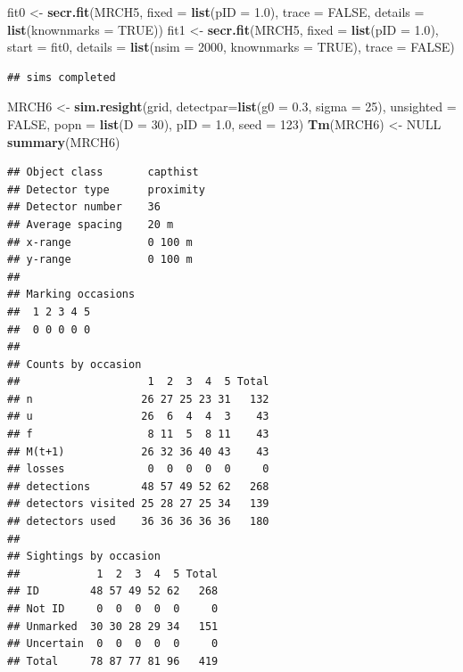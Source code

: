 \documentclass[
]{book}
\newenvironment{Shaded}{\begin{snugshade}}{\end{snugshade}}
\newcommand{\AttributeTok}[1]{\textcolor[rgb]{0.13,0.29,0.53}{#1}}
\newcommand{\ConstantTok}[1]{\textcolor[rgb]{0.56,0.35,0.01}{#1}}
\newcommand{\DecValTok}[1]{\textcolor[rgb]{0.00,0.00,0.81}{#1}}
\newcommand{\FloatTok}[1]{\textcolor[rgb]{0.00,0.00,0.81}{#1}}
\newcommand{\FunctionTok}[1]{\textcolor[rgb]{0.13,0.29,0.53}{\textbf{#1}}}
\newcommand{\NormalTok}[1]{#1}
\newcommand{\OtherTok}[1]{\textcolor[rgb]{0.56,0.35,0.01}{#1}}
\begin{document}
\begin{Shaded}
\begin{Highlighting}[]
\NormalTok{fit0 }\OtherTok{\textless{}{-}} \FunctionTok{secr.fit}\NormalTok{(MRCH5, }\AttributeTok{fixed =} \FunctionTok{list}\NormalTok{(}\AttributeTok{pID =} \FloatTok{1.0}\NormalTok{), }\AttributeTok{trace =} \ConstantTok{FALSE}\NormalTok{,}
                 \AttributeTok{details =} \FunctionTok{list}\NormalTok{(}\AttributeTok{knownmarks =} \ConstantTok{TRUE}\NormalTok{))}
\NormalTok{fit1 }\OtherTok{\textless{}{-}} \FunctionTok{secr.fit}\NormalTok{(MRCH5, }\AttributeTok{fixed =} \FunctionTok{list}\NormalTok{(}\AttributeTok{pID =} \FloatTok{1.0}\NormalTok{), }\AttributeTok{start =}\NormalTok{ fit0, }
                 \AttributeTok{details =} \FunctionTok{list}\NormalTok{(}\AttributeTok{nsim =} \DecValTok{2000}\NormalTok{, }\AttributeTok{knownmarks =} \ConstantTok{TRUE}\NormalTok{),}
                 \AttributeTok{trace =} \ConstantTok{FALSE}\NormalTok{)}
\end{Highlighting}
\end{Shaded}

\begin{verbatim}
## sims completed
\end{verbatim}

\begin{Shaded}
\begin{Highlighting}[]
\NormalTok{MRCH6 }\OtherTok{\textless{}{-}} \FunctionTok{sim.resight}\NormalTok{(grid, }\AttributeTok{detectpar=}\FunctionTok{list}\NormalTok{(}\AttributeTok{g0 =} \FloatTok{0.3}\NormalTok{, }\AttributeTok{sigma =} \DecValTok{25}\NormalTok{), }
           \AttributeTok{unsighted =} \ConstantTok{FALSE}\NormalTok{, }\AttributeTok{popn =} \FunctionTok{list}\NormalTok{(}\AttributeTok{D =} \DecValTok{30}\NormalTok{), }\AttributeTok{pID =} \FloatTok{1.0}\NormalTok{, }\AttributeTok{seed =} \DecValTok{123}\NormalTok{)}
\FunctionTok{Tm}\NormalTok{(MRCH6) }\OtherTok{\textless{}{-}} \ConstantTok{NULL}
\FunctionTok{summary}\NormalTok{(MRCH6)}
\end{Highlighting}
\end{Shaded}

\begin{verbatim}
## Object class       capthist 
## Detector type      proximity 
## Detector number    36 
## Average spacing    20 m 
## x-range            0 100 m 
## y-range            0 100 m 
## 
## Marking occasions
##  1 2 3 4 5
##  0 0 0 0 0
## 
## Counts by occasion 
##                    1  2  3  4  5 Total
## n                 26 27 25 23 31   132
## u                 26  6  4  4  3    43
## f                  8 11  5  8 11    43
## M(t+1)            26 32 36 40 43    43
## losses             0  0  0  0  0     0
## detections        48 57 49 52 62   268
## detectors visited 25 28 27 25 34   139
## detectors used    36 36 36 36 36   180
## 
## Sightings by occasion 
##            1  2  3  4  5 Total
## ID        48 57 49 52 62   268
## Not ID     0  0  0  0  0     0
## Unmarked  30 30 28 29 34   151
## Uncertain  0  0  0  0  0     0
## Total     78 87 77 81 96   419
\end{verbatim}
\end{document}
